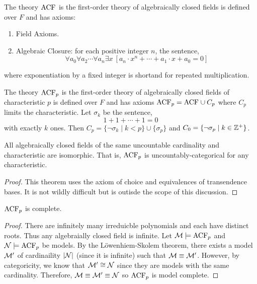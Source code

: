 \documentclass[12pt]{article}
\begin{document}
\begin{definition}
The theory $\mathrm{ACF}_{}$ is the first-order theory of algebraically closed fields is defined over $F$ and has axioms:
\begin{enumerate}
\item Field Axioms.
\item Algebraic Closure: for each positive integer $n$, the sentence,
\[ \forall a_0 \forall a_2 \cdots \forall a_n \exists x \: \left[ a_n \cdot x^n + \cdots + a_1 \cdot x + a_0 = 0 \right] \]
\end{enumerate}
where exponentiation by a fixed integer is shortand for repeated multiplication. 
\end{definition}

\begin{definition}
The theory $\mathrm{ACF}_{p}$ is the first-order theory of algebraically closed fields of characteristic $p$ is defined over $F$ and has axioms $\mathrm{ACF}_{p} = \mathrm{ACF}_{} \cup C_p$ where $C_p$ limits the characteristic. Let $\sigma_k$ be the sentence,
\[ 1 + 1 + \cdots + 1 = 0 \]
with exactly $k$ ones. Then $C_p = \{ \neg \sigma_k \mid k < p \} \cup \{ \sigma_p \}$ and $C_0 = \{ \neg \sigma_p \mid k \in \mathbb{Z}^{+} \}$.  
\end{definition}

\begin{theorem}[Steinitz]
All algebraically closed fields of the same uncountable cardinality and characteristic are isomorphic. That is, $\mathrm{ACF}_{p}$ is uncountably-categorical for any characteristic.
\end{theorem}

\begin{proof}
This theorem uses the axiom of choice and equivalences of transendence bases. It is not wildly difficult but is outisde the scope of this discussion.
\end{proof}


\begin{corollary}
$\mathrm{ACF}_{p}$ is complete.
\end{corollary}

\begin{proof}
There are infinitely many irreduicble polynomials and each have distinct roots. Thus any algebraially closed field is infinite. Let $ \mathcal{M} \models \mathrm{ACF}_{p}$ and $\mathcal{N} \models \mathrm{ACF}_{p}$ be models. By the L\"{o}wenhiem-Skolem theorem, there exists a model $\mathcal{M}'$ of cardinaility $|\mathcal{N}|$ (since it is infinite) such that $\mathcal{M} \equiv \mathcal{M}'$. However, by categoricity, we know that $\mathcal{M}' \cong \mathcal{N}$ since they are models with the same cardinality. Therefore, $\mathcal{M} \equiv \mathcal{M}' \equiv \mathcal{N}$ so $\mathrm{ACF}_{p}$ is model complete.  
\end{proof}
\end{document}
